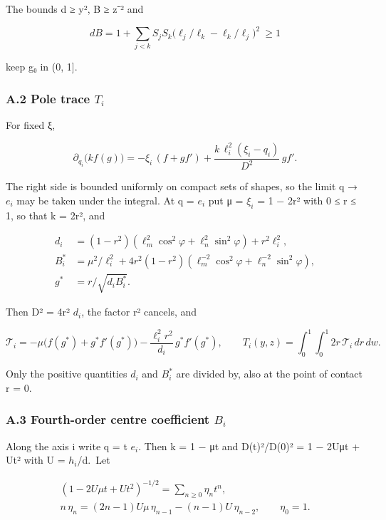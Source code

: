 \documentclass[
  11pt,
]{article}
\begin{document}
The bounds d ≥ y², B ≥ z⁻² and

\[
dB=1+\sum_{j<k}S_jS_k\bigl(\ell_j/\ell_k-\ell_k/\ell_j\bigr)^2\ \ge 1
\]

keep g₀ in (0, 1{]}.

\subsubsection{\texorpdfstring{A.2 Pole trace
\(T_{i}\)}{A.2 Pole trace T\_\{i\}}}

For fixed ξ,

\[
\partial_{q_i}\bigl(k f(g)\bigr)=-\xi_i\,(f+g f')+\frac{k\,\ell_i^2(\xi_i-q_i)}{D^2}\,g f' .
\]

The right side is bounded uniformly on compact sets of shapes, so the
limit q → \(e_{i}\) may be taken under the integral. At q = \(e_{i}\)
put μ = \(\xi_{i}\) = 1 − 2r² with 0 ≤ r ≤ 1, so that k = 2r², and

\[
\begin{aligned}
d_i&=(1-r^2)(\ell_m^2\cos^2\varphi+\ell_n^2\sin^2\varphi)+r^2\ell_i^2,\\
B_i^{\ast}&=\mu^2/\ell_i^2+4r^2(1-r^2)(\ell_m^{-2}\cos^2\varphi+\ell_n^{-2}\sin^2\varphi),\\
g^{\ast}&=r/\sqrt{d_iB_i^{\ast}} .
\end{aligned}
\]

Then D² = 4r² \(d_{i}\), the factor r² cancels, and

\[
\mathcal T_i=-\mu\bigl(f(g^{\ast})+g^{\ast}f'(g^{\ast})\bigr)-\frac{\ell_i^2r^2}{d_i}\,g^{\ast}f'(g^{\ast}),\qquad
T_i(y,z)=\int_0^1\!\!\int_0^1 2r\,\mathcal T_i\,dr\,dw .
\]

Only the positive quantities \(d_{i}\) and \(B_{i}^{\ast}\) are divided
by, also at the point of contact r = 0.

\subsubsection{\texorpdfstring{A.3 Fourth-order centre coefficient
\(B_{i}\)}{A.3 Fourth-order centre coefficient B\_\{i\}}}

Along the axis i write q = t \(e_{i}\). Then k = 1 − μt and D(t)²/D(0)²
= 1 − 2Uμt + Ut² with U = \(h_{i}\)/d.~Let

\[
\begin{gathered}(1-2U\mu t+Ut^2)^{-1/2}=\sum_{n\ge0}\eta_n t^n,\\ n\,\eta_n=(2n-1)U\mu\,\eta_{n-1}-(n-1)U\,\eta_{n-2},\qquad \eta_0=1 .\end{gathered}
\]
\end{document}
